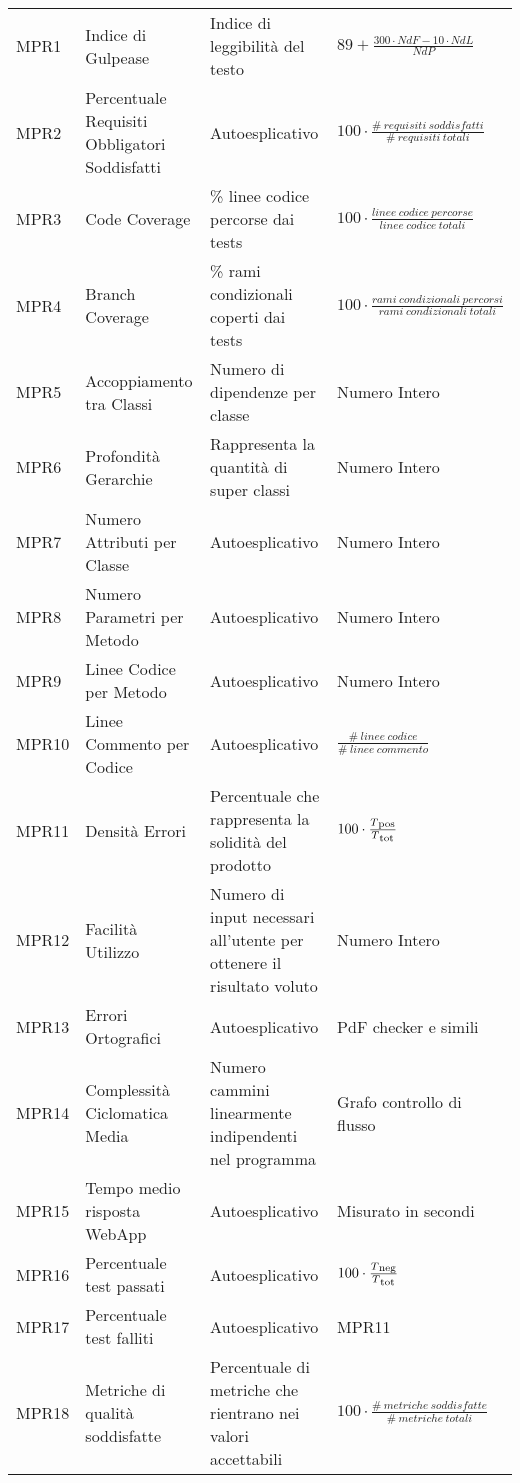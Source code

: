 {\begin{longtable}{C{.115\freewidth} C{.257\freewidth} C{.26\freewidth} C{.4\freewidth}}
    
    MPR1 & Indice di Gulpease & Indice di leggibilità del testo & $89+\frac{300\cdot NdF-10\cdot NdL}{NdP}$  \\
    MPR2 & Percentuale Requisiti Obbligatori Soddisfatti & Autoesplicativo & $100\cdot \frac{\# \: requisiti \: soddisfatti}{\# \: requisiti \: totali}$ \\
    MPR3 & Code Coverage & \% linee codice percorse dai tests & $100\cdot \frac{linee \: codice \: percorse}{linee \: codice \: totali}$ \\
    MPR4 & Branch Coverage & \% rami condizionali coperti dai tests  & $100\cdot \frac{rami \: condizionali \: percorsi}{rami \: condizionali \: totali}$ \\
    MPR5 & Accoppiamento tra Classi & Numero di dipendenze per classe & Numero Intero \\
    MPR6 & Profondità Gerarchie & Rappresenta la quantità di super classi & Numero Intero \\
    MPR7 & Numero Attributi per Classe & Autoesplicativo & Numero Intero \\
    MPR8 & Numero Parametri per Metodo & Autoesplicativo & Numero Intero \\
    MPR9 & Linee Codice per Metodo & Autoesplicativo & Numero Intero \\
    MPR10 & Linee Commento per Codice & Autoesplicativo & $\frac{\# \: linee \: codice}{\# \: linee \: commento}$ \\
    MPR11 & Densità Errori & Percentuale che rappresenta la solidità del prodotto & $100\cdot \frac{T\textsubscript{pos}}{T\textsubscript{tot}}$ \\
    MPR12 & Facilità Utilizzo  & Numero di input necessari all'utente per ottenere il risultato voluto & Numero Intero \\
    MPR13 & Errori Ortografici & Autoesplicativo & PdF checker e simili \\
    MPR14 & Complessità Ciclomatica Media & Numero cammini linearmente indipendenti nel programma & Grafo controllo di flusso \\
    MPR15 & Tempo medio risposta WebApp & Autoesplicativo & Misurato in secondi \\
    MPR16 & Percentuale test passati & Autoesplicativo & $100\cdot \frac{T\textsubscript{neg}}{ T\textsubscript{tot}}$ \\
    MPR17 & Percentuale test falliti & Autoesplicativo & MPR11 \\
    MPR18 & Metriche di qualità soddisfatte & Percentuale di metriche che rientrano nei valori accettabili & $100\cdot \frac{\# \: metriche \: soddisfatte}{\# \: metriche \: totali}$ \\	   
    \bottomrule
    \end{longtable}
}